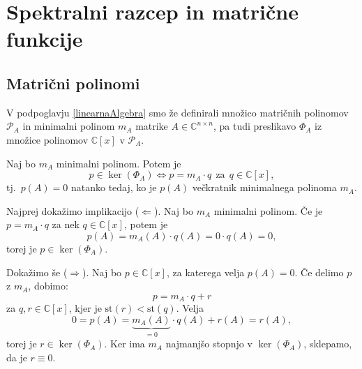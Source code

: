\documentclass[mat1]{fmfdelo}
\newcommand{\C}{\mathbb C}
\begin{document}
\section{Spektralni razcep in matrične funkcije}
\subsection{Matrični polinomi}
V podpoglavju \ref{linearnaAlgebra} smo že definirali množico matričnih polinomov $\mathcal{P}_A$ in minimalni polinom $m_A$ matrike $A \in \C^{n \times n}$, pa tudi preslikavo $\Phi_A$ iz množice polinomov $\C [x]$ v $\mathcal{P}_A$.
\begin{trditev}\label{trditevMinimalniPolinom}
    Naj bo $m_A$ minimalni polinom. Potem je
    \begin{equation*}
        p \in \ker (\Phi_A) \Leftrightarrow p = m_A \cdot q\ \  \text{za}\ \ q \in \C [x],
    \end{equation*}
    tj.\ $p(A) = 0$ natanko tedaj, ko je $p(A)$ večkratnik minimalnega polinoma $m_A$.
\end{trditev}
\begin{dokaz}
    Najprej dokažimo implikacijo ($\Leftarrow$). Naj bo $m_A$ minimalni polinom. Če je $p = m_A\cdot q$ za nek $q \in \C [x]$, potem je
    \begin{equation*}
        p(A) = m_A(A) \cdot q(A) = 0 \cdot q(A) = 0,
    \end{equation*}
    torej je $p \in \ker(\Phi_A)$.
    
    Dokažimo še ($\Rightarrow$). Naj bo $p \in \C [x]$, za katerega velja $p(A) = 0$. Če delimo $p$ z $m_A$, dobimo:
    \begin{equation*}
        p = m_A \cdot q + r
    \end{equation*}
    za $q, r \in \C [x]$, kjer je $\text{st}(r) < \text{st}(q)$. Velja
    \begin{equation*}
        0 = p(A) = \underbrace{m_A(A)}_{=0} \cdot q(A) + r(A) = r(A),
    \end{equation*}
    torej je $r \in \ker(\Phi_A)$. Ker ima $m_A$ najmanjšo stopnjo v $\ker(\Phi_A)$, sklepamo, da je $r \equiv 0$.
\end{dokaz}
\end{document}
